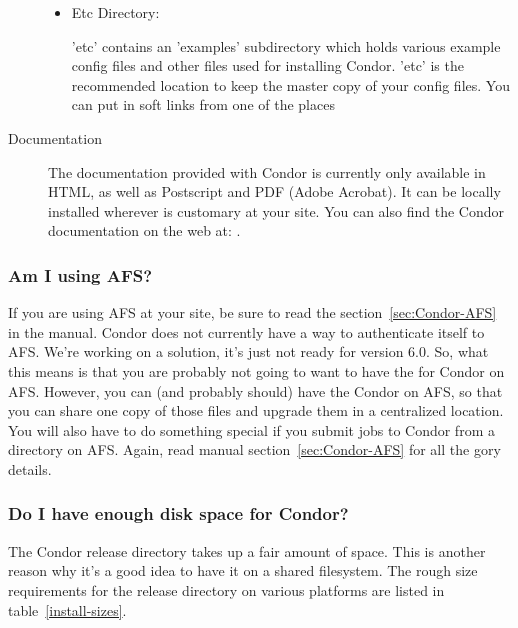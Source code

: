 \begin{description}
\begin{itemize}
     \item Etc Directory:

     'etc' contains an 'examples' subdirectory which holds various
     example config files and other files used for installing Condor.
     'etc' is the recommended location to keep the master copy of your
     config files.  You can put in soft links from one of the places
\end{itemize}

\item[Documentation]

The documentation provided with Condor is currently only available 
in HTML, as well as Postscript and PDF (Adobe Acrobat).  It can be locally installed wherever is
customary at your site.  You can also find the Condor documentation on
the web at: .

\end{description}

\subsubsection{ Am I using AFS? }

If you are using AFS at your site, be sure to read the 
section~\ref{sec:Condor-AFS} in the manual.  Condor does not
currently have a way to authenticate itself to AFS.  We're working on
a solution, it's just not ready for version 6.0.  So, what this means
is that you are probably not going to want to have the  for
Condor on AFS.  However, you can (and probably should) have the Condor
 on AFS, so that you can share one copy of those files
and upgrade them in a centralized location.  You will also have to do
something special if you submit jobs to Condor from a directory on
AFS.  Again, read manual section~\ref{sec:Condor-AFS} for all the gory details. 

\subsubsection{ Do I have enough disk space for Condor? }

The Condor release directory takes up a fair amount of space.  This is
another reason why it's a good idea to have it on a shared
filesystem.  The rough size requirements for the release
directory on various platforms are listed in table~\ref{install-sizes}.

